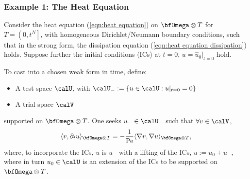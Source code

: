 \subsubsection{Example 1: The Heat Equation}
    \begin{example}
        Consider the heat equation (\ref{eqn:heat equation}) on $\bfOmega\otimes T$ for $T  =  \left(0, t^{N}\right]$, with homogeneous Dirichlet/Neumann boundary conditions, such that in the strong form, the dissipation equation (\ref{eqn:heat equation dissipation}) holds. Suppose further the initial conditions (ICs) at $t  =  0$, $u  =  \widehat{u}_{0}|_{t = 0}$ hold.
        
        To cast into a chosen weak form in time, define:
        \begin{itemize}
            \item  A test space $\calU$, with $\calU_{-}  :=  \{u  \in  \calU  : 
         u|_{t = 0}  =  0\}$
            \item  A trial space $\calV$
        \end{itemize}
        supported on $\bfOmega\otimes T$. One seeks $u_{-}  \in  \calU_{-}$ such that $\forall  v  \in  \calV$,
        \begin{equation}\label{eqn:heat equation weak form}
            \langle v, \partial_{t}u\rangle_{\bfOmega\otimes T}  =   - \frac{1}{\rmPe}\langle\nabla v, \nabla u\rangle_{\bfOmega\otimes T},
        \end{equation}
        where, to incorporate the ICs, $u$ is $u_{-}$ with a lifting of the ICs, $u  :=  u_{0} + u_{-}$, where in turn $u_{0}  \in  \calU$ is an extension of the ICs to be supported on $\bfOmega\otimes T$.
        

\end{example}
